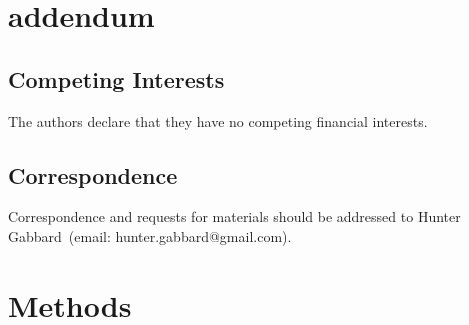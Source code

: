 \documentclass[%
showpacs,
nofootinbib,
 amsmath,amssymb,
 aps,
 twocolumn,
 prl,
 reprint,
floatfix,
]{revtex4-1}
\begin{document}

\section{addendum}
 \subsection{Competing Interests} 
    The authors declare that they have no competing financial interests.
 \subsection{Correspondence} Correspondence and requests for materials should be addressed to Hunter Gabbard~(email: hunter.gabbard@gmail.com).

%
%
\section{Methods}\label{sec:methods}
%
\end{document}
